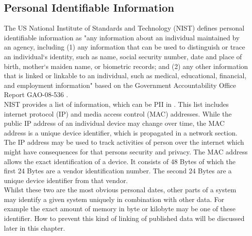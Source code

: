     \subsection{Personal Identifiable Information}
        \label{subsec:related:pii}
        The US National Institute of Standards and Technology (NIST) defines personal identifiable information as "any information about an individual maintained by an agency, including (1) any information that can be used to distinguish or trace an individual‘s identity, such as name, social security number, date and place of birth, mother‘s maiden name, or biometric records; and (2) any other information that is linked or linkable to an individual, such as medical, educational, financial, and employment information"  \cite{mccallister_guide_2010} based on the Government Accountability Office Report GAO-08-536  \cite{government_accountability_office_privacy_2008}.\\
        NIST provides a list of information, which can be PII in   \cite{mccallister_guide_2010}. This list includes internet protocol (IP) and media access control (MAC) addresses. While the public IP address of an individual device may change over time, the MAC address is a unique device identifier, which is propagated in a network section.
        The IP address may be used to track activities of person over the internet which might have consequences for that persons security and privacy. 
        The MAC address allows the exact identification of a device. It consists of 48 Bytes of which the first 24 Bytes are a vendor identification number. The second 24 Bytes are a unique device identifier from that vendor.\\
        Whilst these two are the most obvious personal dates, other parts of a system may identify 
        a given system uniquely in combination with other data. For example the exact amount of memory in byte or kilobyte may be one of these identifier. How to prevent this kind of linking of published data will be discussed later in this chapter.\\
        
